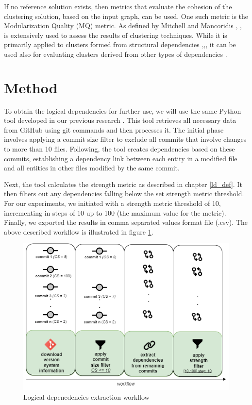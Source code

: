 \documentclass[conference]{IEEEtran}
\begin{document}
If no reference solution exists, then metrics that evaluate the cohesion of the clustering solution, based on the input graph, can be used. One such metric is the Modularization Quality (MQ) metric. As defined by Mitchell and Mancoridis \cite{mqmetric}, \cite{mqmetric2}, is extensively used to assess the results of clustering techniques. While it is primarily applied to clusters formed from structural dependencies \cite{Bunch1},\cite{Bunch2},\cite{Bunch3}, it can be used also for evaluating clusters derived from other types of dependencies \cite{clustering-ld-lexical}.


\section{Method}
\label{method}

To obtain the logical dependencies for further use, we will use the same Python tool developed in our previous research \cite{articlekeyclass23}. This tool retrieves all necessary data from GitHub \cite{ApacheAntGitHub} using git commands and then processes it. 
The initial phase involves applying a commit size filter to exclude all commits that involve changes to more than 10 files. Following, the tool creates dependencies based on these commits, establishing a dependency link between each entity in a modified file and all entities in other files modified by the same commit. 

Next, the tool calculates the strength metric as described in chapter \ref{ld_def}. It then filters out any dependencies falling below the set strength metric threshold. For our experiments, we initiated with a strength metric threshold of 10, incrementing in steps of 10 up to 100 (the maximum value for the metric). Finally, we exported the results in comma separated values format file (.csv). The above described workflow is illustrated in figure \ref{fig:extraction}.


\begin{figure}
\centering
\includegraphics[width=\columnwidth]{dependencies-export.png}
\caption{Logical depenedencies extraction workflow}
\label{fig:extraction}
\centering
\end{figure}
\end{document}
